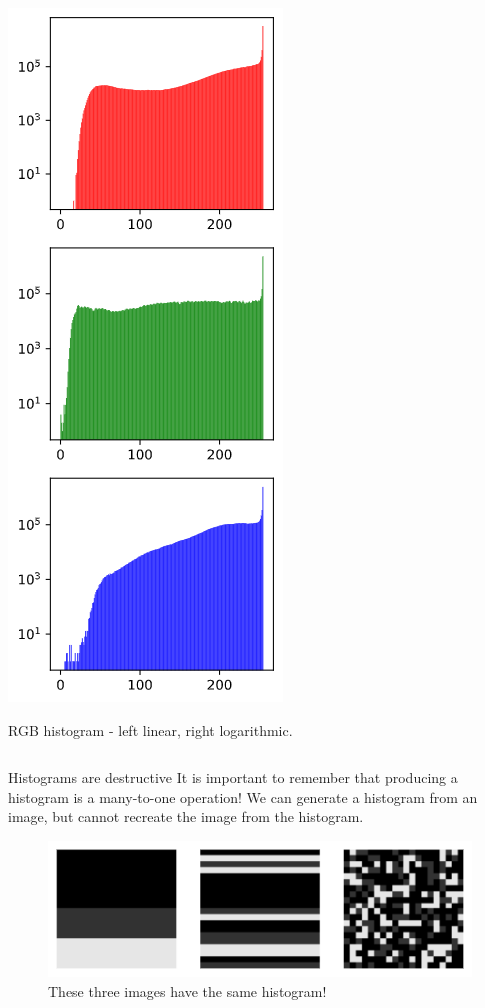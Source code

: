 \documentclass[9pt, aspectratio=169]{beamer}
\begin{document}
\begin{frame}
\begin{columns}
\begin{column}{0.5\textwidth}
            \includegraphics[height=.785\textheight]{RGBhistolog.png}

            \small{\color{gray}RGB histogram - left linear, right logarithmic.}
        \end{column}
    \end{columns}
\end{frame}

\begin{frame}
    {Histograms are destructive}
    It is important to remember that producing a histogram is a many-to-one operation! We can generate a histogram from an image, but cannot recreate the image from the histogram.

    \begin{figure}
        \includegraphics[width=.5\textwidth]{samehisto.png}
        \caption{These three images have the same histogram!}
    \end{figure}
\end{frame}
\end{document}
